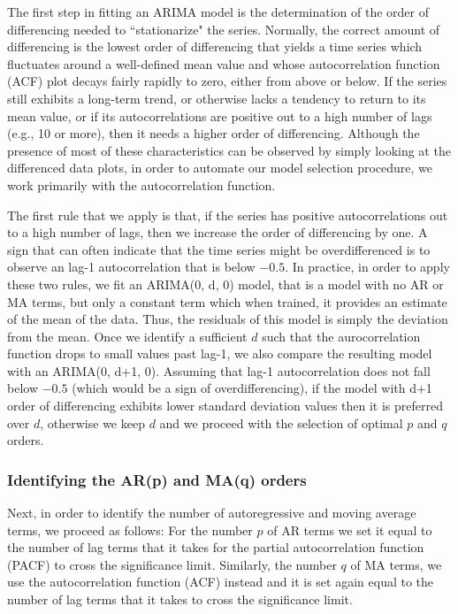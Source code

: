 The first step in fitting an ARIMA model is the determination of the order of differencing needed to ``stationarize" the series. Normally, the correct amount of differencing is the lowest order of differencing that yields a time series which fluctuates around a well-defined mean value and whose autocorrelation function (ACF) plot decays fairly rapidly to zero, either from above or below. If the series still exhibits a long-term trend, or otherwise lacks a tendency to return to its mean value, or if its autocorrelations are positive out to a high number of lags (e.g., 10 or more), then it needs a higher order of differencing. Although the presence of most of these characteristics can be observed by simply looking at the differenced data plots, in order to automate our model selection procedure, we work primarily with the autocorrelation function.

The first rule that we apply is that, if the series has positive autocorrelations out to a high number of lags, then we increase the order of differencing by one. 
A sign that can often indicate that the time series might be overdifferenced is to observe an lag-1 autocorrelation that is below $-0.5$. In practice, in order to apply these two rules, we fit an ARIMA(0, d, 0) model, that is a model with no AR or MA terms, but only a constant term which when trained, it provides an estimate of the mean of the data. Thus, the residuals of this model is simply the deviation from the mean. Once we identify a sufficient $d$ such that the aurocorrelation function drops to small values past lag-1, we also compare the resulting model with an ARIMA(0, d+1, 0). Assuming that lag-1 autocorrelation does not fall below $-0.5$ (which would be a sign of overdifferencing), if the model with d+1 order of differencing exhibits lower standard deviation values then it is preferred over $d$, otherwise we keep $d$ and we proceed with the selection of optimal $p$ and $q$ orders. 

\subsubsection*{Identifying the AR(p) and MA(q) orders}

Next, in order to identify the number of autoregressive and moving average terms, we proceed as follows: 
For the number $p$ of AR terms we set it equal to the number of lag terms that it takes for the partial autocorrelation function (PACF) to cross the significance limit.
%
Similarly, the number $q$ of MA terms, we use the autocorrelation function (ACF) instead and it is set again equal to the number of lag terms that it takes to cross the significance limit. 

